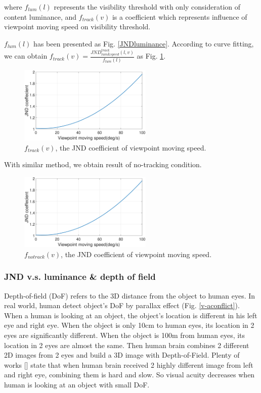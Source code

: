 where $f_{lum}(l)$ represents the visibility threshold with only consideration of content luminance, and $f_{track}(v)$ is a coefficient which represents influence of viewpoint moving speed on visibility threshold.

$f_{lum}(l)$ has been presented as Fig. \ref{JNDluminance}. According to curve fitting, we can obtain $f_{track}(v) = \frac{JND_{lum\&speed}^{track}(l, v)}{f_{lum}(l)}$ as Fig. \ref{JNDspeed-track}.

\begin{figure}
  \centering
  \includegraphics[width=2.5in]{images/JNDspeed.eps}
  \caption{$f_{track}(v)$, the JND coefficient of viewpoint moving speed.}
  \label{JNDspeed-track}
  \end{figure}

With similar method, we obtain result of no-tracking condition. 

\begin{figure}
  \centering
  \includegraphics[width=2.5in]{images/JNDspeed.eps}
  \caption{$f_{notrack}(v)$, the JND coefficient of viewpoint moving speed.}
  \label{JNDspeed-notrack}
  \end{figure}

\subsubsection{JND v.s. luminance \& depth of field}

Depth-of-field (DoF) refers to the 3D distance from the object to human eyes. In real world, human detect object's DoF by parallax effect (Fig. \ref{v-aconflict}). When a human is looking at an object, the object's location is different in his left eye and right eye. When the object is only 10cm to human eyes, its location in 2 eyes are significantly different. When the object is 100m from human eyes, its location in 2 eyes are almost the same. Then human brain combines 2 different 2D images from 2 eyes and build a 3D image with Depth-of-Field. Plenty of works [] state that when human brain received 2 highly different image from left and right eye, combining them is hard and slow. So visual acuity decreases when human is looking at an object with small DoF.

